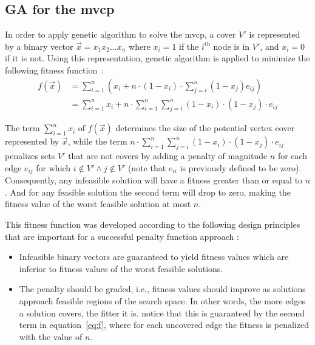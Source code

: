 \documentclass[12pt]{article}
\begin{document}
\subsection{GA for the mvcp}
\label{sec:GAmvcp}
In order to apply genetic algorithm to solve the mvcp, a cover $V'$ is represented
by a binary vector $\vec{x} = x_1x_2 \dots x_n$ where $x_i = 1$ if
the $i^{\text{th}}$ node is in $V'$, and $x_i = 0$ if it is not.
Using this representation, genetic algorithm is applied to minimize the following
fitness function~\cite{mvcp-back}:
\begin{equation}
\label{eq:f}
\begin{split}
f(\vec{x})	&= \sum_{i=1}^{n} \left( x_i+n \cdot (1-x_i) \cdot
			   \sum_{j=i}^{n} (1-x_j) e_{ij} \right) \\
 			&= \sum_{i=1}^{n} x_i + n \cdot \sum_{i=1}^{n}
			   \sum_{j=i}^{n} (1-x_i) \cdot (1-x_j) \cdot e_{ij}
\end{split}
\end{equation}

The term $ \sum_{i=1}^{n} x_i $ of $ f(\vec{x}) $ determines the size of the
potential vertex cover represented by $\vec{x}$, while the term
$ n \cdot \sum_{i=1}^{n} \sum_{j=i}^{n} (1-x_i) \cdot (1-x_j) \cdot e_{ij} $
penalizes sets $V'$ that
are not covers by adding a penalty of magnitude $n$ for
each edge $e_{ij}$ for which $i \notin V' \wedge j \notin V'$
(note that $e_{ii}$ is previously defined to be zero).
Consequently, any infeasible solution will have a fitness greater than
or equal to $n$. And for any feasible solution the second term will
drop to zero, making the fitness value of the worst feasible solution at most $n$.

This fitness function was developed according to the
following design principles that are important for a
successful penalty function approach \cite{7:mvcp, 11:mvcp}:
\begin{itemize}
\vspace{-4mm}

\item Infeasible binary vectors are guaranteed to yield fitness
values which are inferior to fitness values of
the worst feasible solutions.

\item The penalty should be graded, i.e., fitness values
should improve as solutions approach feasible regions
of the search space. In other words, the more edges a solution
covers, the fitter it is. notice that this is guaranteed by the
second term in equation~\ref{eq:f}, where for each uncovered edge
the fitness is penalized with the value of $n$.
\end{itemize}
\end{document}
